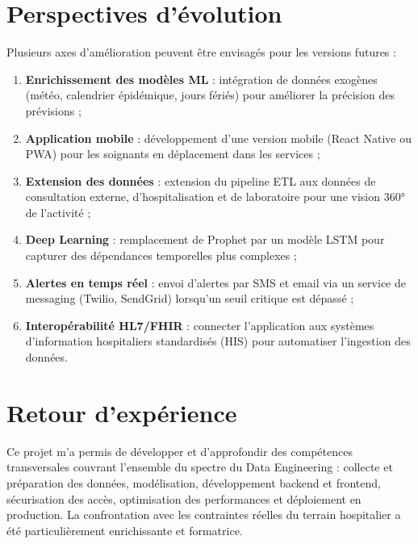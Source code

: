 \documentclass[12pt,a4paper]{report}
\begin{document}
	\section*{Perspectives d'évolution}
	
	Plusieurs axes d'amélioration peuvent être envisagés pour les versions futures :
	
	\begin{enumerate}
		\item \textbf{Enrichissement des modèles ML} : intégration de données exogènes (météo,
		calendrier épidémique, jours fériés) pour améliorer la précision des prévisions ;
		\item \textbf{Application mobile} : développement d'une version mobile (React Native ou
		PWA) pour les soignants en déplacement dans les services ;
		\item \textbf{Extension des données} : extension du pipeline ETL aux données de consultation
		externe, d'hospitalisation et de laboratoire pour une vision 360° de l'activité ;
		\item \textbf{Deep Learning} : remplacement de Prophet par un modèle LSTM pour capturer
		des dépendances temporelles plus complexes ;
		\item \textbf{Alertes en temps réel} : envoi d'alertes par SMS et email via un service
		de messaging (Twilio, SendGrid) lorsqu'un seuil critique est dépassé ;
		\item \textbf{Interopérabilité HL7/FHIR} : connecter l'application aux systèmes
		d'information hospitaliers standardisés (HIS) pour automatiser l'ingestion des données.
	\end{enumerate}
	
	\section*{Retour d'expérience}
	
	Ce projet m'a permis de développer et d'approfondir des compétences transversales couvrant
	l'ensemble du spectre du Data Engineering : collecte et préparation des données, modélisation,
	développement backend et frontend, sécurisation des accès, optimisation des performances
	et déploiement en production. La confrontation avec les contraintes réelles du terrain
	hospitalier a été particulièrement enrichissante et formatrice.
	
\end{document}
